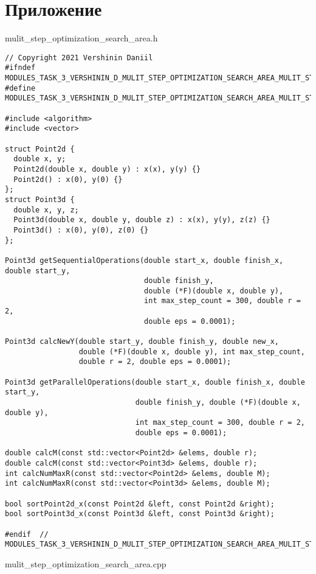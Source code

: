 \documentclass{report}
\begin{document}
\section*{Приложение}
mulit\_step\_optimization\_search\_area.h
\begin{lstlisting}
// Copyright 2021 Vershinin Daniil
#ifndef MODULES_TASK_3_VERSHININ_D_MULIT_STEP_OPTIMIZATION_SEARCH_AREA_MULIT_STEP_OPTIMIZATION_SEARCH_AREA_H_
#define MODULES_TASK_3_VERSHININ_D_MULIT_STEP_OPTIMIZATION_SEARCH_AREA_MULIT_STEP_OPTIMIZATION_SEARCH_AREA_H_

#include <algorithm>
#include <vector>

struct Point2d {
  double x, y;
  Point2d(double x, double y) : x(x), y(y) {}
  Point2d() : x(0), y(0) {}
};
struct Point3d {
  double x, y, z;
  Point3d(double x, double y, double z) : x(x), y(y), z(z) {}
  Point3d() : x(0), y(0), z(0) {}
};

Point3d getSequentialOperations(double start_x, double finish_x, double start_y,
                                double finish_y,
                                double (*F)(double x, double y),
                                int max_step_count = 300, double r = 2,
                                double eps = 0.0001);

Point3d calcNewY(double start_y, double finish_y, double new_x,
                 double (*F)(double x, double y), int max_step_count,
                 double r = 2, double eps = 0.0001);

Point3d getParallelOperations(double start_x, double finish_x, double start_y,
                              double finish_y, double (*F)(double x, double y),
                              int max_step_count = 300, double r = 2,
                              double eps = 0.0001);

double calcM(const std::vector<Point2d> &elems, double r);
double calcM(const std::vector<Point3d> &elems, double r);
int calcNumMaxR(const std::vector<Point2d> &elems, double M);
int calcNumMaxR(const std::vector<Point3d> &elems, double M);

bool sortPoint2d_x(const Point2d &left, const Point2d &right);
bool sortPoint3d_x(const Point3d &left, const Point3d &right);

#endif  // MODULES_TASK_3_VERSHININ_D_MULIT_STEP_OPTIMIZATION_SEARCH_AREA_MULIT_STEP_OPTIMIZATION_SEARCH_AREA_H_
\end{lstlisting}
\newpage
mulit\_step\_optimization\_search\_area.cpp
\end{document}
